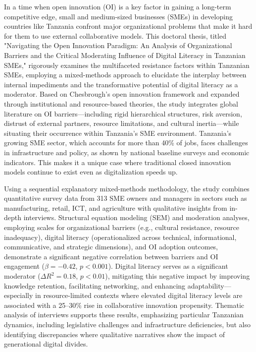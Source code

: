 \noindent In a time when open innovation (OI) is a key factor in gaining a long-term competitive edge, small and medium-sized businesses (SMEs) in developing countries like Tanzania confront major organizational problems that make it hard for them to use external collaborative models. This doctoral thesis, titled "Navigating the Open Innovation Paradigm: An Analysis of Organizational Barriers and the Critical Moderating Influence of Digital Literacy in Tanzanian SMEs," rigorously examines the multifaceted resistance factors within Tanzanian SMEs, employing a mixed-methods approach to elucidate the interplay between internal impediments and the transformative potential of digital literacy as a moderator. Based on Chesbrough's open innovation framework and expanded through institutional and resource-based theories, the study integrates global literature on OI barriers—including rigid hierarchical structures, risk aversion, distrust of external partners, resource limitations, and cultural inertia—while situating their occurrence within Tanzania's SME environment. Tanzania's growing SME sector, which accounts for more than 40\% of jobs, faces challenges in infrastructure and policy, as shown by national baseline surveys and economic indicators. This makes it a unique case where traditional closed innovation models continue to exist even as digitalization speeds up.

\medskip

\noindent Using a sequential explanatory mixed-methods methodology, the study combines quantitative survey data from 313 SME owners and managers in sectors such as manufacturing, retail, ICT, and agriculture with qualitative insights from in-depth interviews. Structural equation modeling (SEM) and moderation analyses, employing scales for organizational barriers (e.g., cultural resistance, resource inadequacy), digital literacy (operationalized across technical, informational, communicative, and strategic dimensions), and OI adoption outcomes, demonstrate a significant negative correlation between barriers and OI engagement ($\beta = -0.42$, $p < 0.001$). Digital literacy serves as a significant moderator ($\Delta R^{2} = 0.18$, $p < 0.01$), mitigating this negative impact by improving knowledge retention, facilitating networking, and enhancing adaptability—especially in resource-limited contexts where elevated digital literacy levels are associated with a 25--30\% rise in collaborative innovation propensity. Thematic analysis of interviews supports these results, emphasizing particular Tanzanian dynamics, including legislative challenges and infrastructure deficiencies, but also identifying discrepancies where qualitative narratives show the impact of generational digital divides.

